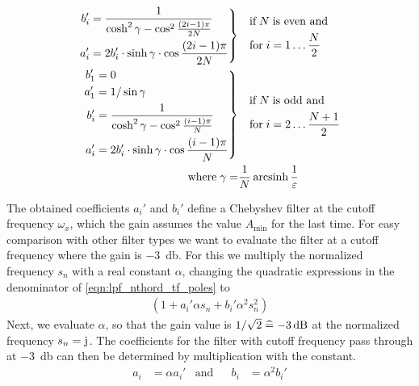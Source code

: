 \begin{align*}
  \left.\begin{aligned}
    b_i' &= \frac{1}{\cosh^2\gamma - \cos^2\frac{(2i-1)\pi}{2N}}\;\\
    a_i' &= 2b_i'\cdot\sinh\gamma\cdot\cos\frac{(2i-1)\pi}{2N}
  \end{aligned}\right\}&
  \quad\begin{aligned}
    &\text{if}\;N\;\text{is even and}\\
    &\text{for}\;i=1\dots\frac{N}{2}
  \end{aligned}\\
  \left.\begin{aligned}
    b_1' &= 0\\
    a_1' &= 1/\sin\gamma\\
    b_i' &= \frac{1}{\cosh^2\gamma - \cos^2\frac{(i-1)\pi}{N}}\;\\
    a_i' &= 2b_i'\cdot\sinh\gamma\cdot\cos\frac{(i-1)\pi}{N}
  \end{aligned}\right\}&
  \quad\begin{aligned}
    &\text{if}\;N\;\text{is odd and}\\
    &\text{for}\;i=2\dots\frac{N+1}{2}
  \end{aligned}\\
  \text{where}\; \gamma = &\frac{1}{N}\operatorname{arcsinh}\frac{1}{\varepsilon}
\end{align*}

The obtained coefficients $a_i'$ and $b_i'$ define a Chebyshev filter at the cutoff frequency $\omega_x$, which the gain assumes the value $A_{\min}$ for the last time. For easy comparison with other filter types we want to evaluate the filter at a cutoff frequency where the gain is \SI{-3}{\decibel}. For this we multiply the normalized frequency $s_n$ with a real constant $\alpha$, changing the quadratic expressions in the denominator of \eqref{eqn:lpf_nthord_tf_poles} to
\begin{align*}
  (1 + a_i'\alpha s_n + b_i'\alpha^2s_n^2)
\end{align*}
Next, we evaluate $\alpha$, so that the gain value is $1/\sqrt{2}\estimates\SI{-3}{\decibel}$ at the normalized frequency $s_n=\mathrm{j}\mkern1mu$. The coefficients for the filter with cutoff frequency pass through at \SI{-3}{\decibel} can then be determined by multiplication with the constant.
\begin{align}
  &&a_i &= \alpha a_i' &\text{and}& &b_i &= \alpha^2b_i'&& \label{eqn:broken_denominator}
\end{align}


